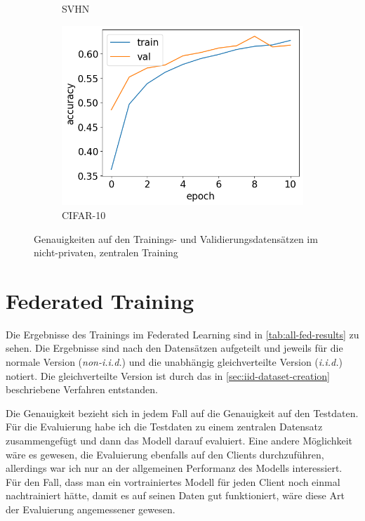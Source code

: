 \begin{figure}
\begin{subfigure}{0.32\textwidth}
		\caption{SVHN}
	\end{subfigure}
	\begin{subfigure}{0.32\textwidth}
		\centering
		\includegraphics[width=\textwidth]{Bilder/cifar-results-local.png}
		\caption{CIFAR-10}
	\end{subfigure}
	\caption{Genauigkeiten auf den Trainings- und Validierungsdatensätzen im nicht-privaten, zentralen Training}
	\label{fig:local-training-histories}
\end{figure}

\section{Federated Training}\label{sec:fl-training-results}

Die Ergebnisse des Trainings im Federated Learning sind in \autoref{tab:all-fed-results} zu sehen. Die Ergebnisse sind nach den Datensätzen aufgeteilt und jeweils für die normale Version (\textit{non-i.i.d.}) und die unabhängig gleichverteilte Version (\textit{i.i.d.}) notiert. Die gleichverteilte Version ist durch das in \autoref{sec:iid-dataset-creation} beschriebene Verfahren entstanden.

Die Genauigkeit bezieht sich in jedem Fall auf die Genauigkeit auf den Testdaten. Für die Evaluierung habe ich die Testdaten zu einem zentralen Datensatz zusammengefügt und dann das Modell darauf evaluiert. Eine andere Möglichkeit wäre es gewesen, die Evaluierung ebenfalls auf den Clients durchzuführen, allerdings war ich nur an der allgemeinen Performanz des Modells interessiert. Für den Fall, dass man ein vortrainiertes Modell für jeden Client noch einmal nachtrainiert hätte, damit es auf seinen Daten gut funktioniert, wäre diese Art der Evaluierung angemessener gewesen.

